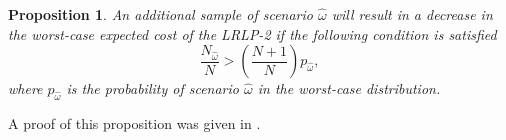 \documentclass[11pt]{article}
\newcommand{\x}{\mathbf{x}}
\renewcommand{\c}{\mathbf{c}}
\DeclareMathOperator*{\argmin}{argmin}
\newtheorem{proposition}[theorem]{Proposition}
\begin{document}
\begin{proposition}
	An additional sample of scenario $\hat{\omega}$ will result in a decrease in the worst-case expected cost of the LRLP-2 if the following condition is satisfied
	\begin{equation} \label{eq:cost_decrease_cond}
		\frac{N_{\hat{\omega}}}{N} > \left( \frac{N+1}{N} \right) p_{\hat{\omega}},
	\end{equation}
	where $p_{\hat{\omega}}$ is the probability of scenario $\hat{\omega}$ in the worst-case distribution.
\end{proposition}

A proof of this proposition was given in \cite{love2013likelihood}.

% 
% 
\end{document}
